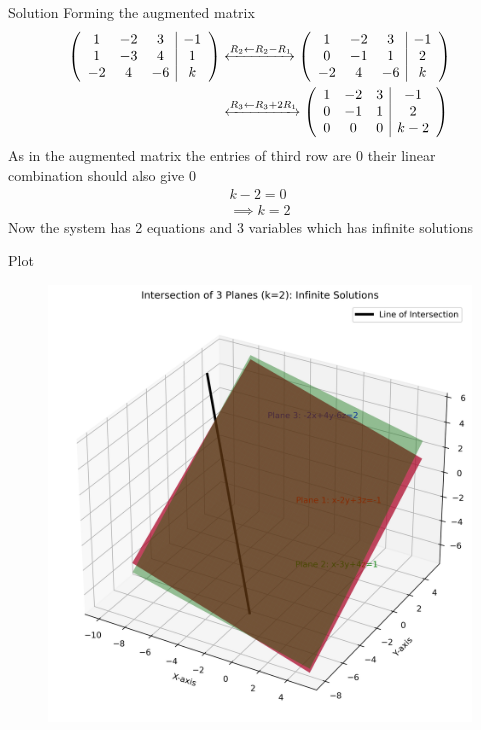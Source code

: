 \documentclass{beamer}
\numberwithin{equation}{section}
\theoremstyle{remark}
\begin{document}
\begin{frame}{Solution}
Forming the augmented matrix
\begin{align}
    \left(\begin{array}{ccc|c}
        1 & -2 & 3 & -1 \\
        1 & -3 & 4 & 1\\
        -2 & 4 & -6 & k\\
\end{array}\right) &\xleftrightarrow{R_2 \leftarrow R_2 -  R_1} \left(\begin{array}{ccc|c}
        1 & -2 & 3 & -1 \\
        0 & -1 & 1 & 2\\
        -2 & 4 & -6 & k\\
\end{array}\right)\\
&\xleftrightarrow{R_3 \leftarrow R_3 +  2R_1} \left(\begin{array}{ccc|c}
        1 & -2 & 3 & -1 \\
        0 & -1 & 1 & 2\\
        0 & 0 & 0 & k-2\\
\end{array}\right)
\end{align}
As in the augmented matrix the entries of third  row are 0 their linear combination should also give 0 
\begin{align}
    k-2=0\\
    \implies k=2
\end{align}
Now the system has 2 equations and 3 variables which has infinite solutions
\end{frame}

\begin{frame}{Plot}
    \begin{figure}[h!]
    \centering
    \includegraphics[width=0.7\columnwidth]{figs/01.png}
    \caption{}
    \label{fig:placeholder}
\end{figure}
\end{frame}
\end{document}

